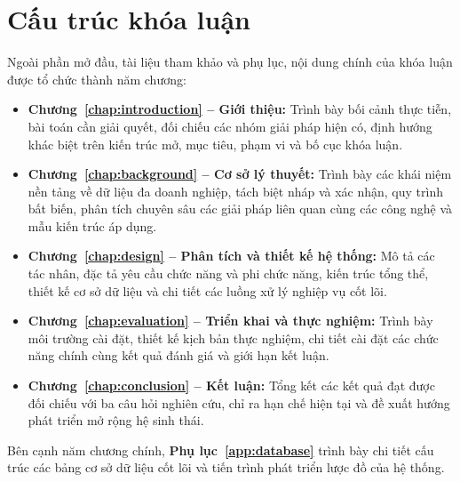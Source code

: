 \section{Cấu trúc khóa luận}
Ngoài phần mở đầu, tài liệu tham khảo và phụ lục, nội dung chính của khóa luận được tổ chức thành năm chương:
\begin{itemize}
  \item \textbf{Chương~\ref{chap:introduction} -- Giới thiệu:} Trình bày bối cảnh thực tiễn, bài toán cần giải quyết, đối chiếu các nhóm giải pháp hiện có, định hướng khác biệt trên kiến trúc mở, mục tiêu, phạm vi và bố cục khóa luận.
  \item \textbf{Chương~\ref{chap:background} -- Cơ sở lý thuyết:} Trình bày các khái niệm nền tảng về dữ liệu đa doanh nghiệp, tách biệt nháp và xác nhận, quy trình bất biến, phân tích chuyên sâu các giải pháp liên quan cùng các công nghệ và mẫu kiến trúc áp dụng.
  \item \textbf{Chương~\ref{chap:design} -- Phân tích và thiết kế hệ thống:} Mô tả các tác nhân, đặc tả yêu cầu chức năng và phi chức năng, kiến trúc tổng thể, thiết kế cơ sở dữ liệu và chi tiết các luồng xử lý nghiệp vụ cốt lõi.
  \item \textbf{Chương~\ref{chap:evaluation} -- Triển khai và thực nghiệm:} Trình bày môi trường cài đặt, thiết kế kịch bản thực nghiệm, chi tiết cài đặt các chức năng chính cùng kết quả đánh giá và giới hạn kết luận.
  \item \textbf{Chương~\ref{chap:conclusion} -- Kết luận:} Tổng kết các kết quả đạt được đối chiếu với ba câu hỏi nghiên cứu, chỉ ra hạn chế hiện tại và đề xuất hướng phát triển mở rộng hệ sinh thái.
\end{itemize}
Bên cạnh năm chương chính, \textbf{Phụ lục~\ref{app:database}} trình bày chi tiết cấu trúc các bảng cơ sở dữ liệu cốt lõi và tiến trình phát triển lược đồ của hệ thống.

